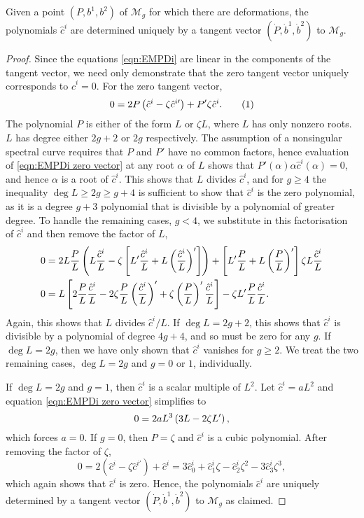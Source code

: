 \documentclass{article}
\begin{document}
\begin{lem}
Given a point $(P,b^1,b^2)$ of $\mathcal{M}_g$ for which there are deformations, the polynomials $\hat{c}^i$ are determined uniquely by a tangent vector $(\dot P, \dot b^1, \dot b^2)$ to $\mathcal{M}_g$.

\begin{proof}
Since the equations \eqref{eqn:EMPDi} are linear in the components of the tangent vector, we need only demonstrate that the zero tangent vector uniquely corresponds to $\hat{c}^i = 0$. For the zero tangent vector,
\[
0 = 2P\left( \hat{c}^i - \zeta\hat {c}^{i\prime}\right) + P' \zeta\hat {c}^i.
\labelthis{eqn:EMPDi zero vector}
\]
The polynomial $P$ is either of the form $L$ or $\zeta L$, where $L$ has only nonzero roots. $L$ has degree either $2g+2$ or $2g$ respectively.
The assumption of a nonsingular spectral curve requires that $P$ and $P'$ have no common factors, hence evaluation of \eqref{eqn:EMPDi zero vector} at any root $\alpha$ of $L$ shows that $P'(\alpha)\alpha\hat{c}^i(\alpha) = 0$, and hence $\alpha$ is a root of $\hat{c}^i$. This shows that $L$ divides $\hat{c}^i$, and for $g\geq 4$ the inequality $\deg L \geq 2g \geq g+4$ is sufficient to show that $\hat{c}^i$ is the zero polynomial, as it is a degree $g+3$ polynomial that is divisible by a polynomial of greater degree. To handle the remaining cases, $g<4$, we substitute in this factorisation of $\hat{c}^i$ and then remove the factor of $L$,
\begin{align*}
    0
    &= 2L\frac{P}{L}\left( L\frac{\hat{c}^i}{L} - \zeta\left[ L' \frac{\hat {c}^i}{L} + L \left(\frac{\hat {c}^i}{L}\right)' \right] \right)
    + \left[L' \frac{P}{L} + L\left(\frac{P}{L}\right)' \right] \zeta L \frac{\hat{c}^i}{L}  \\
    0 &= L \left [ 2\frac{P}{L}\frac{\hat{c}^i}{L} - 2\zeta\frac{P}{L}\left(\frac{\hat {c}^i}{L}\right)' + \zeta\left(\frac{P}{L}\right)'\frac{\hat {c}^i}{L} \right]
    -\zeta L' \frac{P}{L} \frac{\hat {c}^i}{L}.
\end{align*}
Again, this shows that $L$ divides $\hat{c}^i/L$. If $\deg L = 2g+2$, this shows that $\hat{c}^i$ is divisible by a polynomial of degree $4g+4$, and so must be zero for any $g$. If $\deg L = 2g$, then we have only shown that $\hat{c}^i$ vanishes for $g \geq 2$. We treat the two remaining cases, $\deg L = 2g$ and $g = 0$ or $1$, individually.

If $\deg L = 2g$ and $g = 1$, then $\hat{c}^i$ is a scalar multiple of $L^2$. Let $\hat{c}^i = a L^2$ and equation \eqref{eqn:EMPDi zero vector} simplifies to
\[
0 = 2a L^3 \left( 3L - 2\zeta L' \right),
\]
which forces $a = 0$. If $g=0$, then $P=\zeta$ and $\hat{c}^i$ is a cubic polynomial. After removing the factor of $\zeta$,
\[
0
= 2(\hat{c}^i - \zeta\hat{c}^{i\prime}) + \hat{c}^i
= 3\hat{c}^i_0 + \hat{c}^i_1 \zeta - \hat{c}^i_2 \zeta^2 - 3\hat{c}^i_3 \zeta^3,
\]
which again shows that $\hat{c}^i$ is zero. Hence, the polynomials $\hat{c}^i$ are uniquely determined by a tangent vector $(\dot P, \dot b^1, \dot b^2)$ to $\mathcal{M}_g$ as claimed.
\end{proof}
\end{lem}
\end{document}
